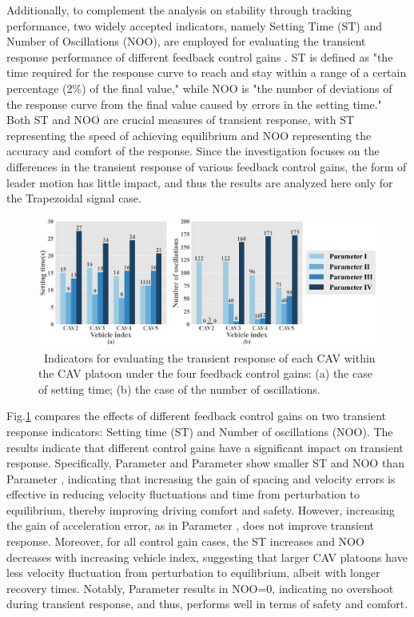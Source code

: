 \documentclass[journal]{IEEEtran}
\begin{document}
Additionally, to complement the analysis on stability through tracking performance, two widely accepted indicators, namely Setting Time (ST) and Number of Oscillations (NOO), are employed for evaluating the transient response performance of different feedback control gains \citep{bennett1993history,sontag2013mathematical}. ST is defined as "the time required for the response curve to reach and stay within a range of a certain percentage (2\%) of the final value," while NOO is "the number of deviations of the response curve from the final value caused by errors in the setting time." Both ST and NOO are crucial measures of transient response, with ST representing the speed of achieving equilibrium and NOO representing the accuracy and comfort of the response. Since the investigation focuses on the differences in the transient response of various feedback control gains, the form of leader motion has little impact, and thus the results are analyzed here only for the Trapezoidal signal case.

\begin{figure}

  \centering
  \includegraphics[width=16cm]{figs/fig6.png}
  \caption{~Indicators for evaluating the transient response of each CAV within the CAV platoon under the four feedback control gains: (a) the case of setting time; (b) the case of the number of oscillations.}
  \label{fig6}
\end{figure}

Fig.\ref{fig6} compares the effects of different feedback control gains on two transient response indicators: Setting time (ST) and Number of oscillations (NOO). The results indicate that different control gains have a significant impact on transient response. Specifically, Parameter \uppercase\expandafter{} and Parameter \uppercase\expandafter{} show smaller ST and NOO than Parameter \uppercase\expandafter{}, indicating that increasing the gain of spacing and velocity errors is effective in reducing velocity fluctuations and time from perturbation to equilibrium, thereby improving driving comfort and safety. However, increasing the gain of acceleration error, as in Parameter \uppercase\expandafter{}, does not improve transient response. Moreover, for all control gain cases, the ST increases and NOO decreases with increasing vehicle index, suggesting that larger CAV platoons have less velocity fluctuation from perturbation to equilibrium, albeit with longer recovery times. Notably, Parameter \uppercase\expandafter{} results in NOO=0, indicating no overshoot during transient response, and thus, performs well in terms of safety and comfort.
\end{document}
